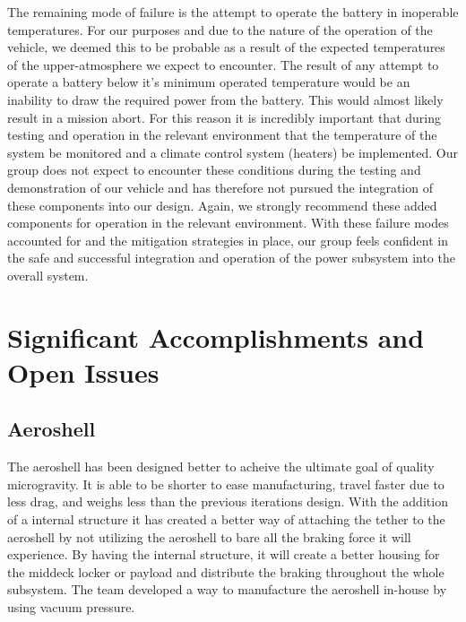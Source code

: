 \indent\indent The remaining mode of failure is the attempt to operate the battery in inoperable temperatures. For our purposes and due to the nature of the operation of the vehicle, we deemed this to be probable as a result of the expected temperatures of the upper-atmosphere we expect to encounter. The result of any attempt to operate a battery below it's minimum operated temperature would be an inability to draw the required power from the battery. This would almost likely result in a mission abort. For this reason it is incredibly important that during testing and operation in the relevant environment that the temperature of the system be monitored and a climate control system (heaters) be implemented. Our group does not expect to encounter these conditions during the testing and demonstration of our vehicle and has therefore not pursued the integration of these components into our design. Again, we strongly recommend these added components for operation in the relevant environment. 
With these failure modes accounted for and the mitigation strategies in place, our group feels confident in the safe and successful integration and operation of the power subsystem into the overall system.


\section{Significant Accomplishments and Open Issues}

\subsection{Aeroshell}

\indent\indent The aeroshell has been designed better to acheive the ultimate goal of quality microgravity. It is able to be shorter to ease manufacturing, travel faster due to less drag, and weighs less than the previous iterations design. With the addition of a internal structure it has created a better way of attaching the tether to the aeroshell by not utilizing the aeroshell to bare all the braking force it will experience. By having the internal structure, it will create a better housing for the middeck locker or payload and distribute the braking throughout the whole subsystem. The team developed a way to manufacture the aeroshell in-house by using vacuum pressure.


